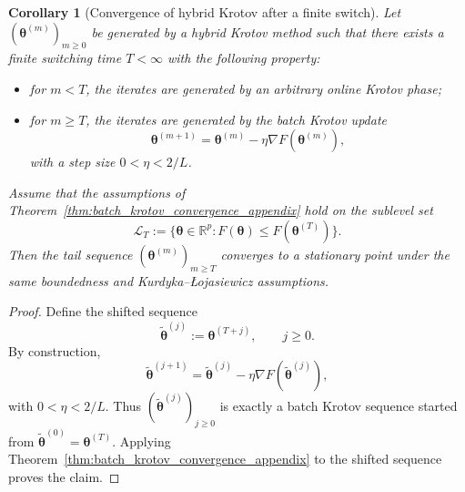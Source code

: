 \documentclass[aps,prb,10pt,twocolumn,superscriptaddress]{revtex4-2}
\newtheorem{corollary}[theorem]{Corollary}
\begin{document}
\begin{corollary}[Convergence of hybrid Krotov after a finite switch]
\label{cor:hybrid_krotov_convergence_appendix}
Let \((\bm{\theta}^{(m)})_{m\geq 0}\) be generated by a hybrid Krotov method such that there exists a finite switching time \(T<\infty\) with the following property:
\begin{itemize}
    \item for \(m<T\), the iterates are generated by an arbitrary online Krotov phase;
    \item for \(m\geq T\), the iterates are generated by the batch Krotov update
    \[
    \bm{\theta}^{(m+1)}
    =
    \bm{\theta}^{(m)}-\eta \nabla F(\bm{\theta}^{(m)}),
    \]
    with a step size \(0<\eta<2/L\).
\end{itemize}
Assume that the assumptions of Theorem~\ref{thm:batch_krotov_convergence_appendix} hold on the sublevel set
\[
\mathcal{L}_T:=\{\bm{\theta}\in\mathbb{R}^p : F(\bm{\theta})\leq F(\bm{\theta}^{(T)})\}.
\]
Then the tail sequence \((\bm{\theta}^{(m)})_{m\geq T}\) converges to a stationary point under the same boundedness and Kurdyka--\L{}ojasiewicz assumptions.
\end{corollary}

\begin{proof}
Define the shifted sequence
\[
\widetilde{\bm{\theta}}^{(j)}:=\bm{\theta}^{(T+j)}, \qquad j\geq 0.
\]
By construction,
\[
\widetilde{\bm{\theta}}^{(j+1)}
=
\widetilde{\bm{\theta}}^{(j)}-\eta \nabla F(\widetilde{\bm{\theta}}^{(j)}),
\]
with \(0<\eta<2/L\). Thus \((\widetilde{\bm{\theta}}^{(j)})_{j\geq 0}\) is exactly a batch Krotov sequence started from \(\widetilde{\bm{\theta}}^{(0)}=\bm{\theta}^{(T)}\). Applying Theorem~\ref{thm:batch_krotov_convergence_appendix} to the shifted sequence proves the claim.
\end{proof}
\end{document}
